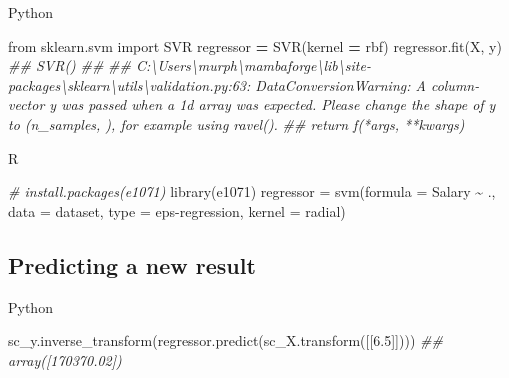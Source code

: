 \documentclass[
]{book}
\newenvironment{Shaded}{\begin{snugshade}}{\end{snugshade}}
\newcommand{\AttributeTok}[1]{\textcolor[rgb]{0.77,0.63,0.00}{#1}}
\newcommand{\CommentTok}[1]{\textcolor[rgb]{0.56,0.35,0.01}{\textit{#1}}}
\newcommand{\FloatTok}[1]{\textcolor[rgb]{0.00,0.00,0.81}{#1}}
\newcommand{\FunctionTok}[1]{\textcolor[rgb]{0.00,0.00,0.00}{#1}}
\newcommand{\ImportTok}[1]{#1}
\newcommand{\NormalTok}[1]{#1}
\newcommand{\OperatorTok}[1]{\textcolor[rgb]{0.81,0.36,0.00}{\textbf{#1}}}
\newcommand{\OtherTok}[1]{\textcolor[rgb]{0.56,0.35,0.01}{#1}}
\newcommand{\SpecialCharTok}[1]{\textcolor[rgb]{0.00,0.00,0.00}{#1}}
\newcommand{\StringTok}[1]{\textcolor[rgb]{0.31,0.60,0.02}{#1}}
\theoremstyle{definition}
\theoremstyle{definition}
\theoremstyle{definition}
\theoremstyle{definition}
\theoremstyle{remark}
\begin{document}
Python

\begin{Shaded}
\begin{Highlighting}[]
\ImportTok{from}\NormalTok{ sklearn.svm }\ImportTok{import}\NormalTok{ SVR}
\NormalTok{regressor }\OperatorTok{=}\NormalTok{ SVR(kernel }\OperatorTok{=} \StringTok{\textquotesingle{}rbf\textquotesingle{}}\NormalTok{)}
\NormalTok{regressor.fit(X, y)}
\CommentTok{\#\# SVR()}
\CommentTok{\#\# }
\CommentTok{\#\# C:\textbackslash{}Users\textbackslash{}murph\textbackslash{}mambaforge\textbackslash{}lib\textbackslash{}site{-}packages\textbackslash{}sklearn\textbackslash{}utils\textbackslash{}validation.py:63: DataConversionWarning: A column{-}vector y was passed when a 1d array was expected. Please change the shape of y to (n\_samples, ), for example using ravel().}
\CommentTok{\#\#   return f(*args, **kwargs)}
\end{Highlighting}
\end{Shaded}

R

\begin{Shaded}
\begin{Highlighting}[]
\CommentTok{\# install.packages(\textquotesingle{}e1071\textquotesingle{})}
\FunctionTok{library}\NormalTok{(e1071)}
\NormalTok{regressor }\OtherTok{=} \FunctionTok{svm}\NormalTok{(}\AttributeTok{formula =}\NormalTok{ Salary }\SpecialCharTok{\textasciitilde{}}\NormalTok{ .,}
                \AttributeTok{data =}\NormalTok{ dataset,}
                \AttributeTok{type =} \StringTok{\textquotesingle{}eps{-}regression\textquotesingle{}}\NormalTok{,}
                \AttributeTok{kernel =} \StringTok{\textquotesingle{}radial\textquotesingle{}}\NormalTok{)}
\end{Highlighting}
\end{Shaded}

\hypertarget{predicting-a-new-result}{%
\subsection{Predicting a new result}\label{predicting-a-new-result}}

Python

\begin{Shaded}
\begin{Highlighting}[]
\NormalTok{sc\_y.inverse\_transform(regressor.predict(sc\_X.transform([[}\FloatTok{6.5}\NormalTok{]])))}
\CommentTok{\#\# array([170370.02])}
\end{Highlighting}
\end{Shaded}
\end{document}
